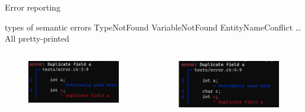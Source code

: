 \documentclass[aspectratio=1610]{ctexbeamer}
\begin{document}
\begin{frame}{Error reporting}
    \begin{outline}
         types of semantic errors
            \2 TypeNotFound
            \2 VariableNotFound
            \2 EntityNameConflict
            \2 \dots
        \1 All pretty-printed
    \end{outline}
    \begin{columns}
        \begin{column}{.5\linewidth}
            \begin{figure}[htp]
              \centering
              \includegraphics[width=.8\linewidth]{image2.png}
              \caption{}
            \end{figure}
        \end{column}
        \begin{column}{.5\linewidth}
            \begin{figure}[htp]
              \centering
              \includegraphics[width=.8\linewidth]{image3.png}
              \caption{}
            \end{figure}
        \end{column}
    \end{columns}
\end{frame}
\end{document}

